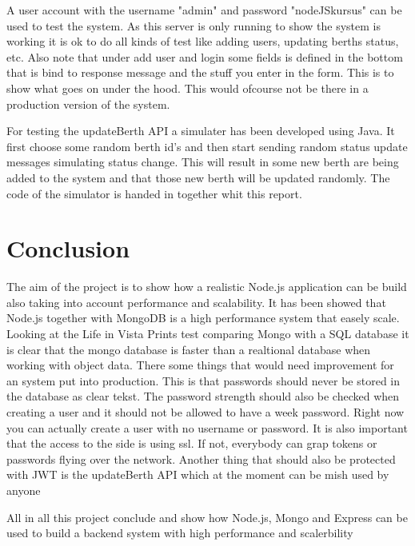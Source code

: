 \documentclass[a4paper,12pt,english]{article}
\begin{document}
A user account with the username "admin" and password "nodeJSkursus" can be
used to test the system. As this server is only running to show the system is
working it is ok to do all kinds of test like adding users, updating berths
status, etc.
Also note that under add user and login some fields is defined in the bottom
that is bind to response message and the stuff you enter in the form. This is to
show what goes on under the hood. This would ofcourse not be there in a
production version of the system.

For testing the updateBerth API a simulater has been developed using Java.
It first choose some random berth id's and then start sending random status
update messages simulating status change. This will result in some new berth
are being added to the system and that those new berth will be updated
randomly. The code of the simulator is handed in together whit this report.
\clearpage
\section{Conclusion}
The aim of the project is to show how a realistic Node.js application can be build also taking into account performance and scalability. It has been showed that Node.js together with MongoDB is a high performance system that easely scale. Looking at the Life in Vista Prints test \cite{mongotest} comparing Mongo with a SQL database it
is clear that the mongo database is faster than a realtional database when
working with object data.
There some things that would need improvement for an system put into
production. This is that passwords should never be stored in the database as
clear tekst. The password strength should also be checked when creating a user
and it should not be allowed to have a week password. Right now you can
actually create a user with no username or password. It is also important that
the access to the side is using ssl. If not, everybody can grap tokens or
passwords flying over the network. Another thing that should also be protected
with JWT is the updateBerth API which at the moment can be mish used by anyone 

All in all this project conclude and show how Node.js, Mongo and Express can be used to build a backend system with high performance and scalerbility
\clearpage
\end{document}
